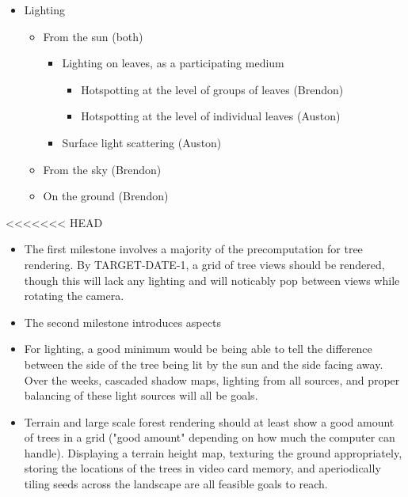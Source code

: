 \documentclass{article}
\begin{document}
\begin{itemize}
\item Lighting
\begin{itemize}
\item From the sun (both)
\begin{itemize}
\item Lighting on leaves, as a participating medium
\begin{itemize}
\item Hotspotting at the level of groups of leaves (Brendon)
\item Hotspotting at the level of individual leaves (Auston)
\end{itemize}

\item Surface light scattering (Auston)
\end{itemize}

\item From the sky (Brendon)
\item On the ground (Brendon)
\end{itemize}

\end{itemize}

<<<<<<< HEAD

\begin {itemize}
\item The first milestone involves a majority of the precomputation for tree rendering. By TARGET-DATE-1, a grid of tree views should be rendered, though this will lack any lighting and will noticably pop between views while rotating the camera.

\item The second milestone introduces aspects 

\item For lighting, a good minimum would be being able to tell the difference between the side of the tree being lit by the sun and the side facing away. Over the weeks, cascaded shadow maps, lighting from all sources, and proper balancing of these light sources will all be goals.

\item Terrain and large scale forest rendering should at least show a good amount of trees in a grid ("good amount" depending on how much the computer can handle). Displaying a terrain height map, texturing the ground appropriately, storing the locations of the trees in video card memory, and aperiodically tiling seeds across the landscape are all feasible goals to reach.

\end {itemize}
\end{document}
